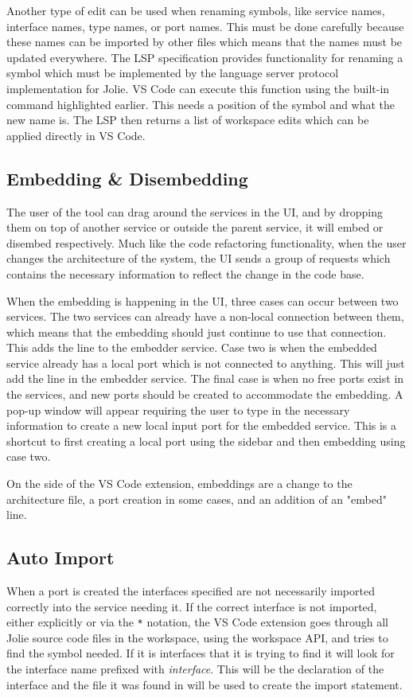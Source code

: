 Another type of edit can be used when renaming symbols, like service names, interface names, type names, or port names. This must be done carefully because these names can be imported by other files which means that the names must be updated everywhere.
The LSP specification provides functionality for renaming a symbol which must be implemented by the language server protocol implementation for Jolie.
VS Code can execute this function using the built-in command highlighted earlier. This needs a position of the symbol and what the new name is. The LSP then returns a list of workspace edits which can be applied directly in VS Code.


\subsection{Embedding \& Disembedding}
The user of the tool can drag around the services in the UI, and by dropping them on top of another service or outside the parent service, it will embed or disembed respectively.
Much like the code refactoring functionality, when the user changes the architecture of the system, the UI sends a group of requests which contains the necessary information to reflect the change in the code base.

When the embedding is happening in the UI, three cases can occur between two services. The two services can already have a non-local connection between them, which means that the embedding should just continue to use that connection. This adds the line  to the embedder service.
Case two is when the embedded service already has a local port which is not connected to anything. This will just add the line  in the embedder service.
The final case is when no free ports exist in the services, and new ports should be created to accommodate the embedding. A pop-up window will appear requiring the user to 
type in the necessary information to create a new local input port for the embedded service. This is a shortcut to first creating a local port using the sidebar and then embedding using case two.

On the side of the VS Code extension, embeddings are a change to the architecture file, a port creation in some cases, and an addition of an "embed" line.

\subsection{Auto Import}
When a port is created the interfaces specified are not necessarily imported correctly into the service needing it.
If the correct interface is not imported, either explicitly or via the \texttt{*} notation,
the VS Code extension goes through all Jolie source code files in the workspace, using the workspace API, and tries to find the symbol needed. If it is interfaces that it is trying to find
it will look for the interface name prefixed with \emph{interface}. This will be the declaration of the interface and the file it was found in will be used to create the import statement.

